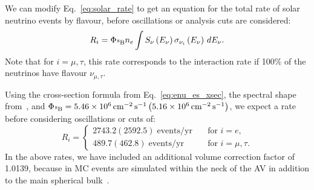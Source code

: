 We can modify Eq.~\ref{eq:solar_rate} to get an equation for the total rate of solar neutrino events by flavour, before oscillations or analysis cuts are considered:\
\begin{equation}
    R_{i} = \Phi_{\beight{}}n_{e}
                \int S_{\nu}\left(E_{\nu}\right)\sigma_{\nu_{i}}\left(E_{\nu}\right)\,dE_{\nu}.
\end{equation}
Note that for $i=\mu,\tau$, this rate corresponds to the interaction rate if 100\% of the neutrinos have flavour $\nu_{\mu,\tau}$.

Using the cross-section formula from Eq.~\ref{eq:enu_es_xsec}, the \beight{} spectral shape from~\cite{winterB8NeutrinoSpectrum2006}, and $\Phi_{\beight{}} = \SI{5.46e6}{\per\cm\squared\per\second} \left(\SI{5.16e6}{\per\cm\squared\per\second}\right)$, we expect a rate before considering oscillations or cuts of:
\begin{equation*}
    R_{i} = 
    \begin{cases}
        2743.2 (2592.5)\; \text{events/yr} & \quad \text{for } i = e,\\
        489.7 (462.8)\;  \text{events/yr} & \quad \text{for } i = \mu,\tau.
    \end{cases}
\end{equation*}
In the above rates, we have included an additional volume correction factor of 1.0139, because in MC events are simulated within the neck of the AV in addition to the main spherical bulk~\cite{}. %

